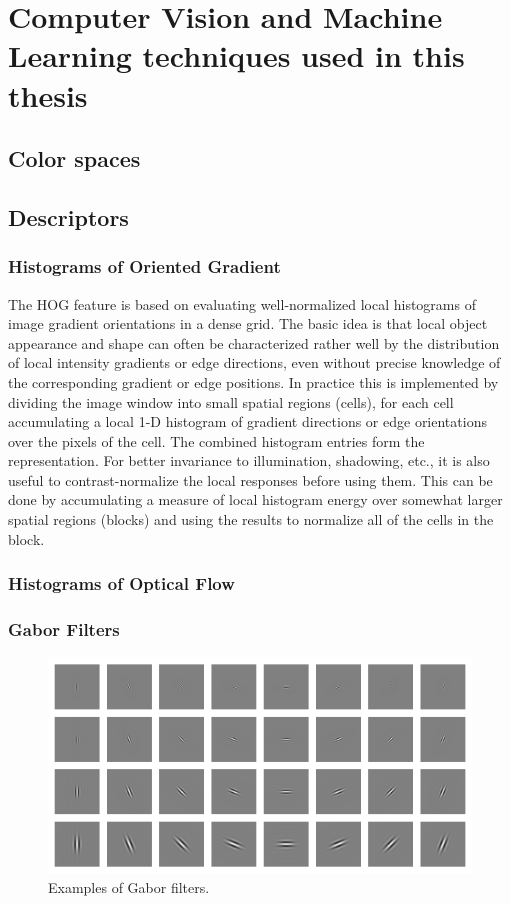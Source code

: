 
\chapter{Computer Vision and Machine Learning techniques used in this thesis}
\label{chpt2}

\section{Color spaces}
\section{Descriptors}
\subsection{Histograms of Oriented Gradient}
The HOG feature \cite{dalal2005histograms} is based on evaluating well-normalized local histograms of image gradient orientations
in a dense grid. The basic idea is that local object appearance and shape can often be characterized rather well by the distribution of local intensity gradients or edge directions, even without precise knowledge of the corresponding gradient or edge positions. In practice this is implemented by dividing the image window into small spatial regions (cells), for each cell accumulating a local 1-D histogram of gradient directions or edge orientations over the pixels of the cell. The combined histogram entries form the representation. For better invariance to illumination, shadowing, etc., it is also useful to contrast-normalize the local 
responses before using them. This can be done by accumulating a measure of local histogram energy over somewhat
larger spatial regions (blocks) and using the results to normalize all of the cells in the block. 

\subsection{Histograms of Optical Flow}
\subsection{Gabor Filters}
\label{Gabor}
\begin{figure}[htbp]
	\centering
		\includegraphics[width=\linewidth]{Figures/gabor.png}
	\caption{Examples of Gabor filters.}
	\label{fig:Gabor}
\end{figure}
